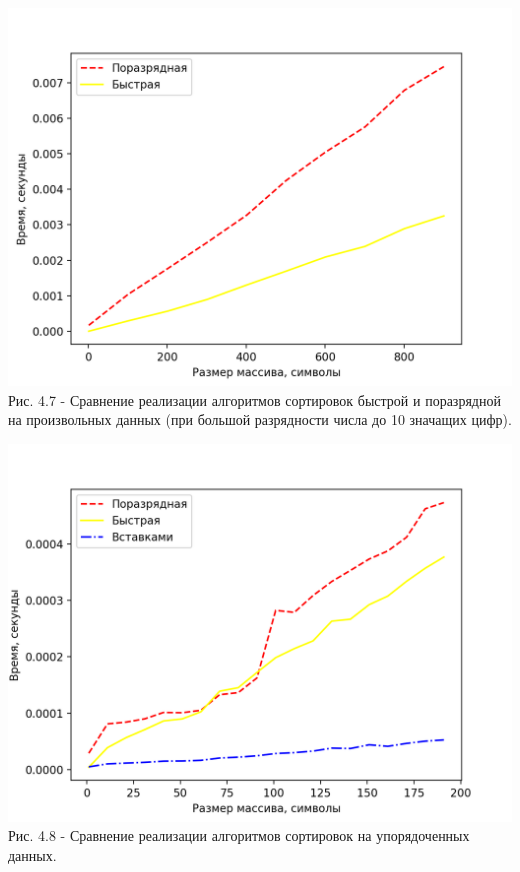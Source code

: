 	\begin{center}
        \includegraphics[scale = 1]{./pictures/graph4} \\ Рис. 4.7 - Сравнение реализации алгоритмов сортировок быстрой и поразрядной на произвольных данных (при
        большой разрядности числа до 10 значащих цифр).
	\end{center}
	\begin{center}
        \includegraphics[scale = 1]{./pictures/graph5} \\ Рис. 4.8 - Сравнение реализации алгоритмов сортировок на упорядоченных данных.
	\end{center}
